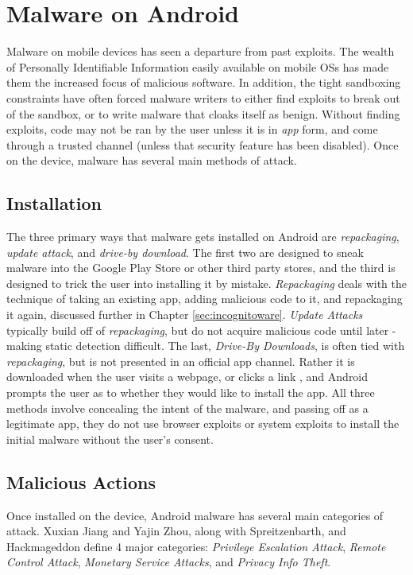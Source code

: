 \chapter{Malware on Android}
\label{sec:malware}

Malware on mobile devices has seen a departure from past exploits. The wealth of Personally Identifiable Information easily available on mobile OSs has made them the increased focus of malicious software. In addition, the tight sandboxing constraints have often forced malware writers to either find exploits to break out of the sandbox, or to write malware that cloaks itself as benign. Without finding exploits, code may not be ran by the user unless it is in \textit{app} form, and come through a trusted channel (unless that security feature has been disabled). Once on the device, malware has several main methods of attack.

\section{Installation}
The three primary ways that malware gets installed on Android are \textit{repackaging}, \textit{update attack}, and \textit{drive-by download}\citep{zhou2012dissecting}. The first two are designed to sneak malware into the Google Play Store or other third party stores, and the third is designed to trick the user into installing it by mistake. \textit{Repackaging} deals with the technique of taking an existing app, adding malicious code to it, and repackaging it again, discussed further in Chapter \ref{sec:incognitoware}. \textit{Update Attacks} typically build off of \textit{repackaging}, but do not acquire malicious code until later - making static detection difficult\citep{zhou2012dissecting}. The last, \textit{Drive-By Downloads}, is often tied with \textit{repackaging}, but is not presented in an official app channel. Rather it is downloaded when the user visits a webpage, or clicks a link \citep{zhou2012dissecting}, and Android prompts the user as to whether they would like to install the app. All three methods involve concealing the intent of the malware, and passing off as a legitimate app, they do not use browser exploits or system exploits to install the initial malware without the user's consent.

\section{Malicious Actions}
Once installed on the device, Android malware has several main categories of attack. Xuxian Jiang
 and Yajin Zhou\citep{zhou2012dissecting}, along with Spreitzenbarth\citep{spreitzenbarth2013}, and Hackmageddon\citep{hackmageddon2011} define 4 major categories: \textit{Privilege Escalation Attack}, \textit{Remote Control Attack}, \textit{Monetary Service Attacks}, and \textit{Privacy Info Theft}. 


